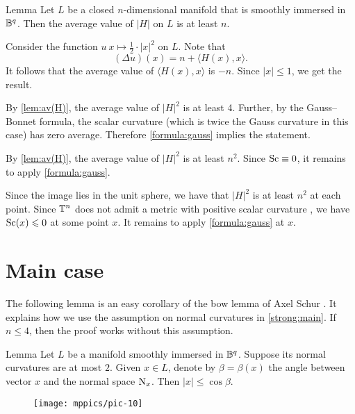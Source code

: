 \documentclass[a4paper,10pt]{article}
\begin{document}
\begin{thm}{Lemma}\label{lem:av(H)}
Let $L$ be a closed $n$-dimensional manifold that is smoothly immersed in $\mathbb{B}^q$.
Then the average value of $|H|$ on $L$ is at least $n$.
\end{thm}

Consider the function $u\:x\mapsto \tfrac12\cdot |x|^2$ on $L$.
Note that 
\[(\Delta u)(x)=n+ \langle H(x),x\rangle.\]
It follows that the average value of $\langle H(x),x\rangle$ is $-n$.
Since $|x|\le1$, we get the result.
\qeds

By \ref{lem:av(H)}, the average value of $|H|^2$ is at least 4.
Further, by the Gauss--Bonnet formula, the scalar curvature (which is twice the Gauss curvature in this case) has zero average.
Therefore \ref{formula:gauss} implies the statement.
\qeds

By \ref{lem:av(H)},
the average value of $|H|^2$ is at least $n^2$.
Since $\mathrm{Sc}\equiv0$, it remains to apply \ref{formula:gauss}.
\qeds

Since the image lies in the unit sphere, we have that $|H|^2$ is at least $n^2$ at each point.
Since $\mathbb{T}^n$ does not admit a metric with positive scalar curvature \cite[Corollary A]{gromov-lawson}, we have $\mathrm{Sc}(x)\leqslant 0$ at some point $x$.
It remains to apply \ref{formula:gauss} at $x$.
\qeds

\section{Main case}

The following lemma is an easy corollary of the bow lemma of Axel Schur \cite{shur,petrunin-zamora}.
It explains how we use the assumption on normal curvatures in \ref{strong:main}.
If $n\le4$, then the proof works without this assumption.

\begin{thm}{Lemma}\label{lem:trivial}
Let $L$ be a manifold smoothly immersed in $\mathbb{B}^q$.
Suppose its normal curvatures are at most $2$.
Given $x\in L$, denote by $\beta=\beta(x)$ the angle between vector $x$ and the normal space $\mathrm{N}_x$.
Then $|x|\le \cos\beta$.
\end{thm}

\begin{wrapfigure}{r}{39 mm}
\vskip-3mm
\centering
\texttt{[image: mppics/pic-10]}
\vskip0mm
\end{wrapfigure}
\end{document}
